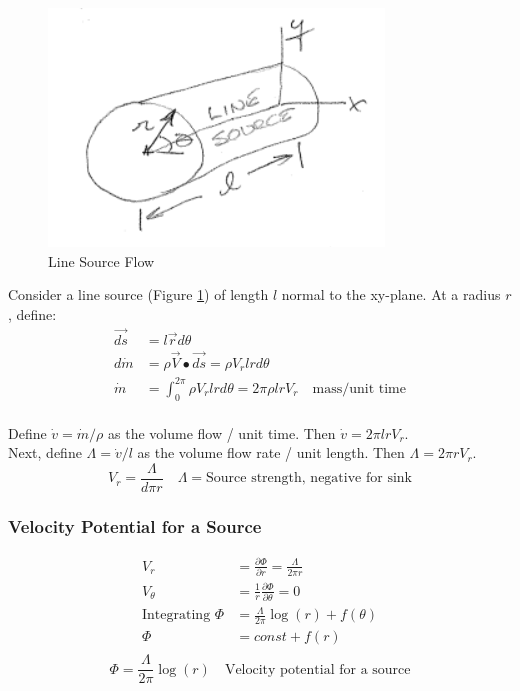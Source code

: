 \documentclass[draft=false, titlepage]{article}
\newcommand{\partialfrac}[2]{\frac{\partial #1}{\partial #2}}
\begin{document}
\begin{figure}[ht]
    \centering
    \includegraphics[width=0.4\linewidth]{Figures/lineSourceFlow.PNG}
    \caption{Line Source Flow}
    \label{fig:LineSourceFlow}
\end{figure}
Consider a line source (Figure \ref{fig:LineSourceFlow}) of length $l$ normal to the xy-plane. At a radius $r$, define:
\begin{align*}
    \vec{ds} &= l\vec{r} d\theta \\
    d\dot{m} &= \rho \vec{V} \bullet \vec{ds} = \rho V_r lr d\theta \\
    \dot{m} &= \int_0^{2\pi} \rho V_r lr d\theta = 2\pi \rho lr V_r \quad \text{mass/unit time} \\
\end{align*}

Define $\dot{v} = \dot{m}/\rho$ as the volume flow / unit time. Then $\dot{v} = 2\pi lr V_r$.\\
Next, define $\Lambda = \dot{v}/l$ as the volume flow rate / unit length. Then $\Lambda = 2\pi rV_r$.
\begin{equation*}
    V_r = \frac{\Lambda}{d\pi r} \quad \Lambda = \text{Source strength, negative for sink}
\end{equation*}

\subsubsection{Velocity Potential for a Source}
\begin{align*}
    V_r &= \partialfrac{\Phi}{r} = \frac{\Lambda}{2\pi r} \\
    V_\theta &= \frac{1}{r} \partialfrac{\Phi}{\theta} = 0 \\
    \text{Integrating } \Phi &= \frac{\Lambda}{2\pi}\log(r) + f(\theta) \\
    \Phi &= const + f(r) \\
\end{align*}
\begin{equation*}
    \boxed{\Phi = \frac{\Lambda}{2\pi}\log(r)} \quad \text{Velocity potential for a source}
\end{equation*}
\end{document}
